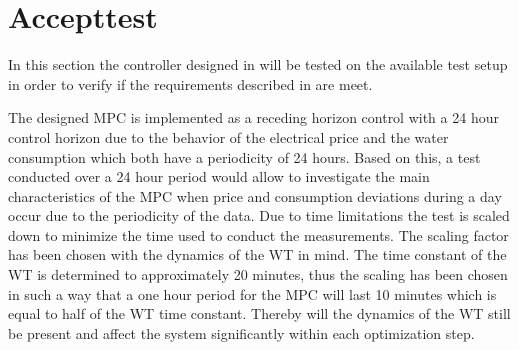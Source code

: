\chapter{Accepttest}
\label{accepttest}

In this section the controller designed in  will be tested on the available test setup in order to verify if the requirements described in  are meet. 

The designed MPC is implemented as a receding horizon control with a 24 hour control horizon due to the behavior of the electrical price and the water consumption which both have a periodicity of 24 hours. 
Based on this, a test conducted over a 24 hour period would allow to investigate the main characteristics of the MPC when price and consumption deviations during a day occur due to the periodicity of the data.   
Due to time limitations the test is scaled down to minimize the time used to conduct the measurements. 
The scaling factor has been chosen with the dynamics of the WT in mind. 
The time constant of the WT is determined to approximately 20 minutes, thus the scaling has been chosen in such a way that a one hour period for the MPC will last 10 minutes which is equal to half of the WT time constant. 
Thereby will the dynamics of the WT still be present and affect the system significantly within each optimization step.

